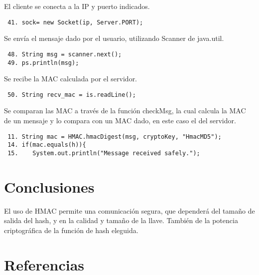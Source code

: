 \documentclass[letter, 10pt]{article}
\begin{document}
El cliente se conecta a la IP y puerto indicados.
\begin{verbatim}
 41. sock= new Socket(ip, Server.PORT);
\end{verbatim}
Se envía el mensaje dado por el usuario, utilizando Scanner de java.util.
\begin{verbatim}
 48. String msg = scanner.next(); 
 49. ps.println(msg); 
\end{verbatim}
Se recibe la MAC calculada por el servidor.
\begin{verbatim}
 50. String recv_mac = is.readLine();  
\end{verbatim}
Se comparan las MAC a través de la función checkMsg, la cual calcula la MAC de un mensaje
y lo compara con un MAC dado, en este caso el del servidor.
\begin{verbatim}
 11. String mac = HMAC.hmacDigest(msg, cryptoKey, "HmacMD5");
 14. if(mac.equals(h)){                                 
 15.    System.out.println("Message received safely.");
\end{verbatim}

\newpage
\section{Conclusiones}
El uso de HMAC permite una comunicación segura, que dependerá del tamaño de salida del hash, y en la calidad
y tamaño de la llave. También de la potencia criptográfica de la función de hash eleguida.


\section{Referencias}
\end{document}
